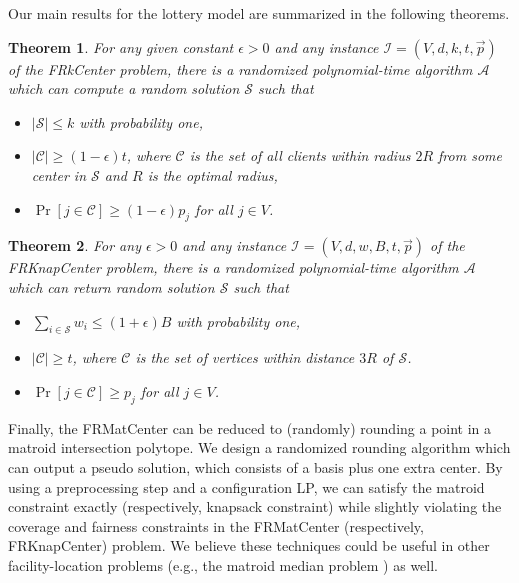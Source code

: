 \documentclass[a4paper,11pt]{article}
\newtheorem{theorem}{Theorem}[section]
\newcommand{\A}{\mathcal{A}}
\newcommand{\C}{\mathcal{C}}
\renewcommand{\S}{\mathcal{S}}
\newcommand{\I}{\mathcal{I}}
\begin{document}
Our main results for the lottery model are summarized in the following theorems.


\begin{theorem}
For any given constant $\epsilon>0$ and any instance $\I = (V, d, k, t, \vec{p})$ of the \textsf{FRkCenter} problem, there is a randomized polynomial-time algorithm $\A$  which can compute a random solution $\S$ such that
\begin{itemize}
	\item $|\S| \leq k$ with probability one,
	\item $|\C| \geq (1-\epsilon)t$, where $\C$ is the set of all clients within radius $2R$ from some center in $\S$ and $R$ is the optimal radius,
	\item $\Pr[j \in \C] \geq (1-\epsilon) p_j$ for all $j \in V$.
\end{itemize}

\label{thm:FRkCenter}
\end{theorem}


\begin{theorem}
For any $\epsilon > 0$ and any instance $\I = (V, d, w, B, t, \vec{p})$ of the \textsf{FRKnapCenter} problem, there is a randomized polynomial-time algorithm $\A$ which can return random solution $\S$ such that 
\begin{itemize}
	\item $\sum_{i \in \S} w_i \leq (1+\epsilon)B$ with probability one,
	\item $|\C| \geq t$, where $\C$ is the set of vertices within distance $3R$ of $\S$.
	\item $\Pr[j \in \C] \geq p_j$ for all $j \in V$.
\end{itemize}  
\label{thm:FRKnapCenter}
\end{theorem}


Finally, the \textsf{FRMatCenter} can be reduced to (randomly) rounding a point in a matroid intersection polytope. We design a randomized rounding algorithm which can output a pseudo solution, which consists of a basis plus one extra center. By using a preprocessing step and  a configuration LP, we can satisfy the matroid constraint exactly (respectively, knapsack constraint) while slightly violating the coverage and fairness constraints in the \textsf{FRMatCenter} (respectively, \textsf{FRKnapCenter}) problem. We believe these techniques could be useful in other facility-location problems  (e.g., the matroid median problem \cite{krishnaswamy_km, swamy_km}) as well. 
\end{document}

